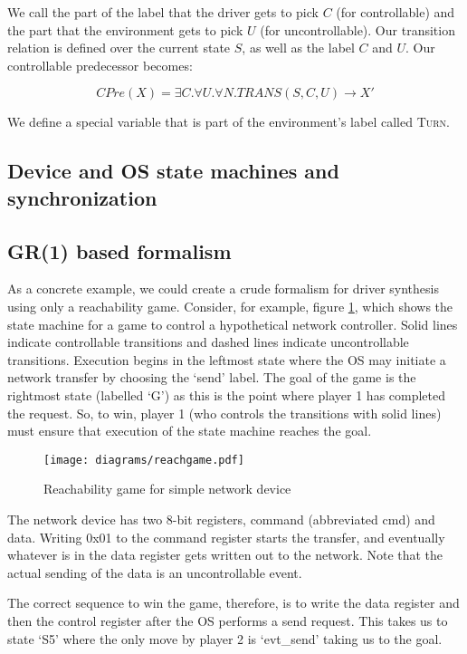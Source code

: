 \documentclass{book}
\theoremstyle{definition}
\begin{document}
We call the part of the label that the driver gets to pick $C$ (for controllable) and the part that the environment gets to pick $U$ (for uncontrollable). Our transition relation is defined over the current state $S$, as well as the label $C$ and $U$. Our controllable predecessor becomes:

\begin{equation}
    CPre(X) = \exists C. \forall U. \forall N. TRANS(S, C, U) \rightarrow X'
\end{equation}

We define a special variable that is part of the environment's label called \textsc{Turn}.

\subsection{Device and OS state machines and synchronization}

\subsection{GR(1) based formalism}

As a concrete example, we could create a crude formalism for driver synthesis using only a reachability game. Consider, for example, figure \ref{fig:reach}, which shows the state machine for a game to control a hypothetical network controller. Solid lines indicate controllable transitions and dashed lines indicate uncontrollable transitions. Execution begins in the leftmost state where the OS may initiate a network transfer by choosing the `send' label. The goal of the game is the rightmost state (labelled `G') as this is the point where player 1 has completed the request. So, to win, player 1 (who controls the transitions with solid lines) must ensure that execution of the state machine reaches the goal. 

\begin{figure}[t]
\centering
\texttt{[image: diagrams/reachgame.pdf]}
\caption{Reachability game for simple network device}
\label{fig:reach}
\end{figure}

The network device has two 8-bit registers, command (abbreviated cmd) and data. Writing 0x01 to the command register starts the transfer, and eventually whatever is in the data register gets written out to the network. Note that the actual sending of the data is an uncontrollable event. 

The correct sequence to win the game, therefore, is to write the data register and then the control register after the OS performs a send request. This takes us to state `S5' where the only move by player 2 is `evt\_send' taking us to the goal. 
\end{document}
